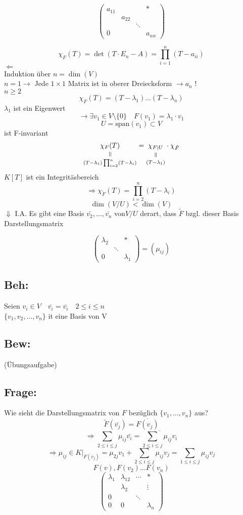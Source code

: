 \documentclass[titlepage,12pt,a4paper,ngerman]{report}
\newcommand{\verteq}{\rotatebox{90}{$\,=$}}
\newcommand{\equalto}[2]{\underset{\scriptstyle\overset{\mkern4mu\verteq}{#2}}{#1}}
\begin{document}
$$\begin{pmatrix}
a_{11} & & & *\\
& a_{22} & & \\
& & \ddots & \\
0 & & & a_{nn}
\end{pmatrix}$$

$$\chi_F(T) = \det(T\cdot E_n - A) = \prod^n_{i=1} (T-a_{ii})$$
$\Leftarrow$\\ Induktion über $n = \dim(V)$\\
$n=1 \rightarrow$ Jede $1\times 1$ Matrix ist in oberer Dreiecksform $\rightarrow a_n$ !\\
$n\ge 2$
$$\chi_F(T) = (T-\lambda_1) \dots (T-\lambda_n)$$
$\lambda_1$ ist ein Eigenwert 
$$\rightarrow \exists v_1 \in V\setminus \{0\} \quad F(v_1) = \lambda_1 \cdot v_1$$
$$U = \textrm{span}(v_1) \subset V$$
ist F-invariant
$$\equalto{\chi_F(T)}{(T-\lambda_1)\prod^n_{i=2}(T-\lambda_i)} = \equalto{\chi_{F \mid U}}{(T-\lambda_1)} \cdot \chi_{\tilde{F}}$$
$K[T]$ ist ein Integritäsbereich
$$\Rightarrow \chi_{\tilde{F}}(T) = \prod^n_{i=2}(T-\lambda_i)$$
$$\dim(V/U) < \dim(V)$$
$\Downarrow$ I.A.
Es gibt eine Basis $\bar{v_2}, \dots , \bar{v_n}$ von$ V/U$ derart, dass $\tilde{F}$ bzgl. dieser Basis Darstellungsmatrix

$$\begin{pmatrix}
\lambda_2 & & * \\
& \ddots & \\
0 & & \lambda_1
\end{pmatrix} = (\mu_{ij})$$
\subsection{Beh:} Seien $v_i \in V \quad \overline{v_i} = \overline{v_i}\quad  2 \le i \le n$\\
$\{v_1,v_2,\dots,v_n\}$ it eine Basis von V

\subsection{Bew: } (Übungsaufgabe)
\subsection{Frage:}
Wie sieht die Darstellungsmatrix von $F$ bezüglich $\{v_1, \dots, v_n  \}$ aus?
$$\tilde{F}(\bar{v_j})=\overline{F(v_j)}$$
$$\Rightarrow \sum_{2\leq i\leq j}\mu_{ij}\bar{v_i} = \overline{\sum_{2\leq i\leq j}\mu_{ij}v_i}$$
$$\Rightarrow \mu_{ij} \in K | _{F(v_j)} = \mu_{2j}v_1 + \sum_{2\leq i \leq j}\mu_{ij}v_j = \sum_{1 \leq i \leq j}\mu_{ij}v_j$$
$$F(v), F(v_2) \dots F(v_n) $$
$$\begin{pmatrix}
\lambda_{1} & \lambda_{12} & \cdots &  *\\ 
& \lambda_2 &  &  \vdots\\ 
0 &  & \ddots &  \\ 
0 & 0 &  & \lambda_n
\end{pmatrix} $$
\end{document}
